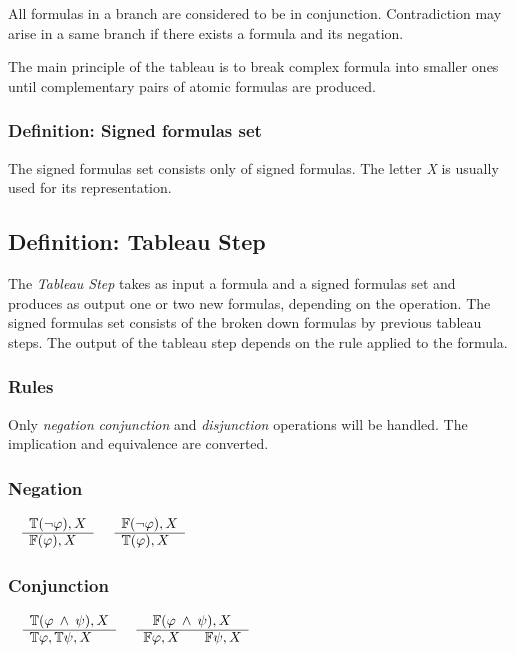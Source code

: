 \documentclass{article}
\begin{document}
	All formulas in a branch are considered to be in conjunction. Contradiction may arise in a same branch if there exists a formula and its negation.

	The main principle of the tableau is to break complex formula into smaller ones until complementary pairs of atomic formulas are produced.

	\subsubsection*{Definition: Signed formulas set}
	The signed formulas set consists only of signed formulas. The letter \textit{X} is usually used for its representation.

	\subsection{Definition: Tableau Step}
	The \textit{Tableau Step} takes as input a formula and a signed formulas set and produces as output one or two new formulas, depending on the operation.
	The signed formulas set consists of the broken down formulas by previous tableau steps.
	The output of the tableau step depends on the rule applied to the formula.

	\subsubsection{Rules}
	Only \textit{negation} \textit{conjunction} and \textit{disjunction} operations will be handled. The implication and equivalence are converted.

		\subsubsection*{Negation}
			$\begin{array}{rl}
				& \mathbb{T}(\neg \varphi), X \\
			      \cline{2-2}
			      & \mathbb{F}(\varphi), X
			\end{array}$
			\:\:\:\:\:\:\:\:\:\:\:\:\:\:\:\:\:\:\:\:\:\:\:\:\:\:\:\:\:\:\:\:\:\:\:\:\:\:\:\:\:\:\:\:\:\:\:\:
			$\begin{array}{rl}
				& \mathbb{F}(\neg \varphi), X \\
			      \cline{2-2}
			      & \mathbb{T}(\varphi), X
			\end{array}$

		\subsubsection*{Conjunction}
			$\begin{array}{rl}
				& \mathbb{T}(\varphi \: \wedge \: \psi), X \\
			      \cline{2-2}
			      & \mathbb{T}\varphi, \mathbb{T}\psi, X
			\end{array}$
			\:\:\:\:\:\:\:\:\:\:\:\:\:\:\:\:\:\:\:\:\:\:\:\:\:\:\:\:\:\:\:\:\:\:\:
			$\begin{array}{rl}
				& \:\:\: \mathbb{F}(\varphi \: \wedge \: \psi), X \\
			      \cline{2-2}
			      & \mathbb{F}\varphi, X \:\:\:\:\:\:\:\: \mathbb{F}\psi, X
			\end{array}$
\end{document}
